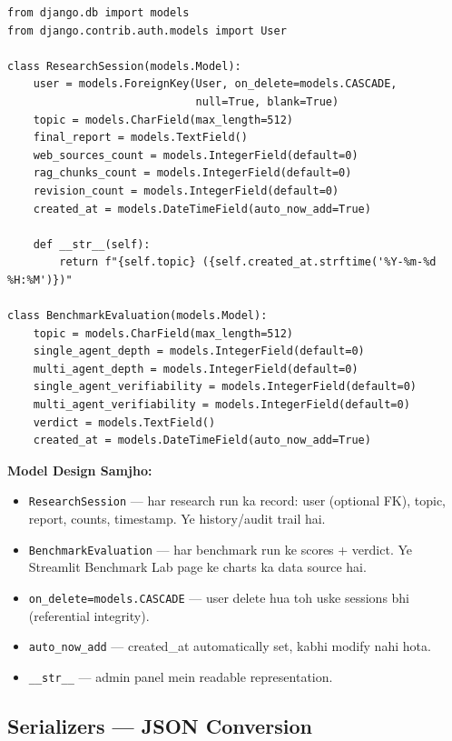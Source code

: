 \documentclass[11pt, a4paper]{article}
\begin{document}
\begin{lstlisting}[style=pythonstyle, caption={backend/api/models.py --- Poora Code}]
from django.db import models
from django.contrib.auth.models import User

class ResearchSession(models.Model):
    user = models.ForeignKey(User, on_delete=models.CASCADE,
                             null=True, blank=True)
    topic = models.CharField(max_length=512)
    final_report = models.TextField()
    web_sources_count = models.IntegerField(default=0)
    rag_chunks_count = models.IntegerField(default=0)
    revision_count = models.IntegerField(default=0)
    created_at = models.DateTimeField(auto_now_add=True)

    def __str__(self):
        return f"{self.topic} ({self.created_at.strftime('%Y-%m-%d %H:%M')})"

class BenchmarkEvaluation(models.Model):
    topic = models.CharField(max_length=512)
    single_agent_depth = models.IntegerField(default=0)
    multi_agent_depth = models.IntegerField(default=0)
    single_agent_verifiability = models.IntegerField(default=0)
    multi_agent_verifiability = models.IntegerField(default=0)
    verdict = models.TextField()
    created_at = models.DateTimeField(auto_now_add=True)
\end{lstlisting}

\begin{codestorybox}
\textbf{Model Design Samjho:}
\begin{itemize}
\item \texttt{ResearchSession} --- har research run ka record: user (optional FK), topic, report, counts, timestamp. Ye history/audit trail hai.
\item \texttt{BenchmarkEvaluation} --- har benchmark run ke scores + verdict. Ye Streamlit Benchmark Lab page ke charts ka data source hai.
\item \texttt{on\_delete=models.CASCADE} --- user delete hua toh uske sessions bhi (referential integrity).
\item \texttt{auto\_now\_add} --- created\_at automatically set, kabhi modify nahi hota.
\item \texttt{\_\_str\_\_} --- admin panel mein readable representation.
\end{itemize}
\end{codestorybox}

\subsection{Serializers --- JSON Conversion}
\end{document}
